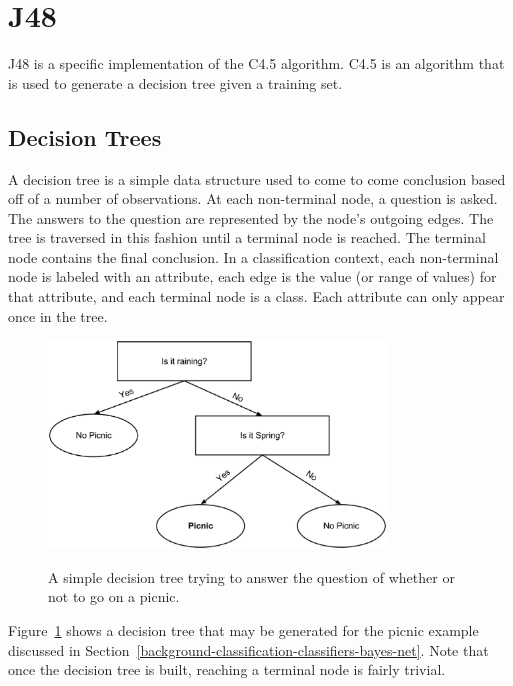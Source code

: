 \documentclass[12pt]{ucthesis}
\newcommand{\captionfonts}{\small\bf\ssp}
\begin{document}
\section{J48}
\label{background-classification-classifiers-j48}
J48 is a specific implementation of the C4.5 algorithm.
C4.5 is an algorithm that is used to generate a decision tree given a training set.

\subsection{Decision Trees}
\label{background-classification-classifiers-j48-decision-trees}
A decision tree is a simple data structure used to come to come conclusion based off of a number of observations.
At each non-terminal node, a question is asked. The answers to the question are represented by the node's outgoing edges.
The tree is traversed in this fashion until a terminal node is reached. The terminal node contains the final conclusion.
In a classification context, each non-terminal node is labeled with an attribute, each edge is the value (or range of values)
for that attribute, and each terminal node is a class. Each attribute can only appear once in the tree.

\begin{figure}
   \begin{center}
      \includegraphics[width=0.8\textwidth]{images/Decision_Tree.eps}
      \captionfonts
      \caption[Simple Decision Tree]{A simple decision tree trying to answer the question of whether or not to go on a picnic.}
      \label{fig:decisionTree}
   \end{center}
\end{figure}

Figure~\ref{fig:decisionTree} shows a decision tree that may be generated for the picnic example discussed in Section~\ref{background-classification-classifiers-bayes-net}.
Note that once the decision tree is built, reaching a terminal node is fairly trivial.
\end{document}
